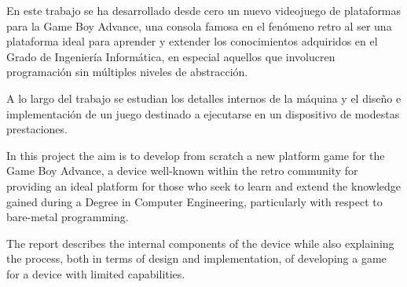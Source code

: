 En este trabajo se ha desarrollado desde cero un nuevo videojuego de plataformas para la Game Boy Advance, una consola famosa en el fenómeno retro al ser una plataforma ideal para aprender y extender los conocimientos adquiridos en el Grado de Ingeniería Informática, en especial aquellos que involucren programación sin múltiples niveles de abstracción.

A lo largo del trabajo se estudian los detalles internos de la máquina y el diseño e implementación de un juego destinado a ejecutarse en un dispositivo de modestas prestaciones.

\vspace{1.5cm}

In this project the aim is to develop from scratch a new platform game for the Game Boy Advance, a device well-known within the retro community for providing an ideal platform for those who seek to learn and extend the knowledge gained during a Degree in Computer Engineering, particularly with respect to bare-metal programming.

The report describes the internal components of the device while also explaining the process, both in terms of design and implementation, of developing a game for a device with limited capabilities.
